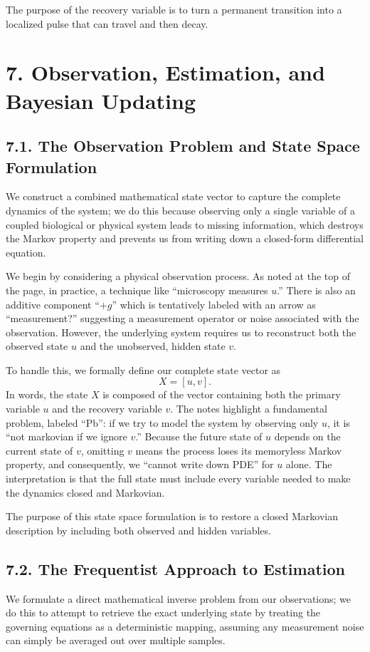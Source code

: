 \documentclass[11pt]{article}
\theoremstyle{definition}
\theoremstyle{remark}
\begin{document}
The purpose of the recovery variable is to turn a permanent transition into a localized pulse that can travel and then decay.

\section*{7. Observation, Estimation, and Bayesian Updating}
\subsection*{7.1. The Observation Problem and State Space Formulation}
We construct a combined mathematical state vector to capture the complete dynamics of the system; we do this because observing only a single variable of a coupled biological or physical system leads to missing information, which destroys the Markov property and prevents us from writing down a closed-form differential equation.

We begin by considering a physical observation process. As noted at the top of the page, in practice, a technique like ``microscopy measures $u$.'' There is also an additive component ``$+g$'' which is tentatively labeled with an arrow as ``measurement?'' suggesting a measurement operator or noise associated with the observation. However, the underlying system requires us to reconstruct both the observed state $u$ and the unobserved, hidden state $v$.

To handle this, we formally define our complete state vector as
\[
X=[u,v].
\]
In words, the state $X$ is composed of the vector containing both the primary variable $u$ and the recovery variable $v$. The notes highlight a fundamental problem, labeled ``Pb'': if we try to model the system by observing only $u$, it is ``not markovian if we ignore $v$.'' Because the future state of $u$ depends on the current state of $v$, omitting $v$ means the process loses its memoryless Markov property, and consequently, we ``cannot write down PDE'' for $u$ alone.
The interpretation is that the full state must include every variable needed to make the dynamics closed and Markovian.

The purpose of this state space formulation is to restore a closed Markovian description by including both observed and hidden variables.

\subsection*{7.2. The Frequentist Approach to Estimation}
We formulate a direct mathematical inverse problem from our observations; we do this to attempt to retrieve the exact underlying state by treating the governing equations as a deterministic mapping, assuming any measurement noise can simply be averaged out over multiple samples.
\end{document}
